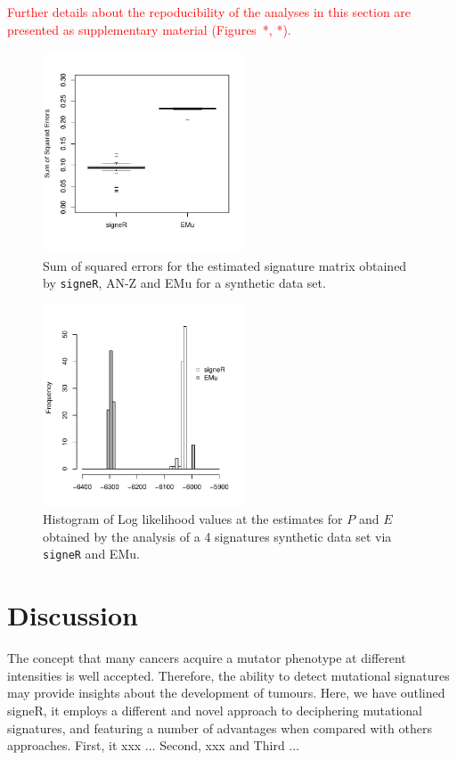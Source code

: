 \documentclass{bioinfo}
\begin{document}
\textcolor{red}{Further details about the repoducibility of the
  analyses in this section are presented as supplementary material (Figures~*, *).}

\begin{figure}  
 \centering
   \includegraphics[width=6cm]{figs/Simulation_signeR_vs_EMu_boxplot_SSE}
  \caption{\textrm{%
    Sum of squared errors for the estimated signature matrix obtained
    by \texttt{signeR}, AN-Z and EMu for a synthetic data set. 
   }
  }
  \label{fig:synth_SSE}
\end{figure}
\begin{figure}  
 \centering
  \includegraphics[width=6cm]{figs/Simulation_signeR_vs_EMu_histogram_LLh_same_axis}
  \caption{\textrm{%
   Histogram of Log likelihood values at the estimates for $P$ and $E$
   obtained by the analysis of a 4 signatures synthetic data set via
   \texttt{signeR} and EMu.
   }
  }
  \label{fig:synth_LLh}
\end{figure}

\section{Discussion}
The concept that many cancers acquire a mutator phenotype at different 
intensities is well accepted. Therefore, the ability to detect 
mutational signatures may provide insights about the development of
tumours. Here, we have outlined signeR, it employs a different and 
novel approach to deciphering mutational signatures, and featuring a
number of advantages when compared with others approaches. First, it
xxx $\ldots$ Second, xxx and Third $\ldots$ 
\end{document}

